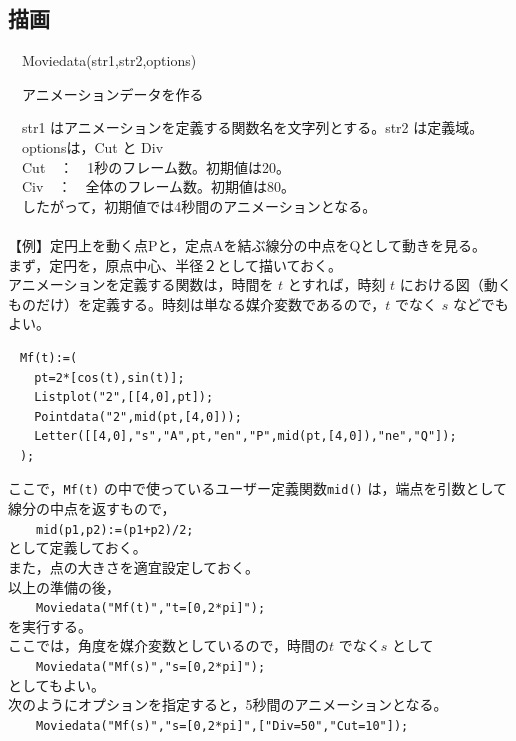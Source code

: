 \documentclass[papersize,a4paper,12pt,uplatex]{jsarticle}
\begin{document}
\subsection{描画}
\begin{description}

\hypertarget{moviedata}{}
\item[関数]　Moviedata(str1,str2,options)
\item[機能]　アニメーションデータを作る
\item[説明]　str1 はアニメーションを定義する関数名を文字列とする。str2 は定義域。\\
　optionsは，Cut と Div \\
　Cut　：　1秒のフレーム数。初期値は20。\\
　Civ　：　全体のフレーム数。初期値は80。\\
　したがって，初期値では4秒間のアニメーションとなる。\\
　\\
【例】定円上を動く点Pと，定点Aを結ぶ線分の中点をQとして動きを見る。\\
まず，定円を，原点中心、半径２として描いておく。\\
アニメーションを定義する関数は，時間を $t$ とすれば，時刻 $t$ における図（動くものだけ）を定義する。時刻は単なる媒介変数であるので，$t$ でなく $s$ などでもよい。
\begin{verbatim}
　Mf(t):=(
　  pt=2*[cos(t),sin(t)];
　  Listplot("2",[[4,0],pt]);
　  Pointdata("2",mid(pt,[4,0]));
　  Letter([[4,0],"s","A",pt,"en","P",mid(pt,[4,0]),"ne","Q"]);
　);
\end{verbatim}
ここで，\verb|Mf(t)| の中で使っているユーザー定義関数\verb|mid()| は，端点を引数として線分の中点を返すもので，\\
　　\verb|mid(p1,p2):=(p1+p2)/2;|\\
として定義しておく。\\
また，点の大きさを適宜設定しておく。\\
以上の準備の後，\\
　　\verb|Moviedata("Mf(t)","t=[0,2*pi]");|\\
を実行する。\\
ここでは，角度を媒介変数としているので，時間の$t$ でなく$s$ として\\
　　\verb|Moviedata("Mf(s)","s=[0,2*pi]");|\\
としてもよい。\\
次のようにオプションを指定すると，5秒間のアニメーションとなる。\\
　　\verb|Moviedata("Mf(s)","s=[0,2*pi]",["Div=50","Cut=10"]);|\\

\end{description}
\end{document}
